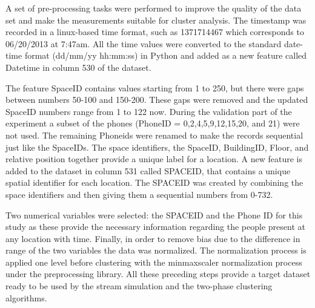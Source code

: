 


A set of pre-processing tasks were performed to improve the quality of the data set and make the measurements suitable for cluster analysis.
The timestamp was recorded in a linux-based time format, such as 1371714467 which corresponds to 06/20/2013 at 7:47am. All the time values were converted to the standard date-time format (dd/mm/yy hh:mm:ss) in Python and added as a new feature called Datetime in column 530 of the dataset.

The feature SpaceID contains values starting from 1 to 250, but there were gaps between numbers 50-100 and 150-200. These gaps were removed and the updated SpaceID numbers range from 1 to 122 now. During the validation part of the experiment a subset of the phones (PhoneID = 0,2,4,5,9,12,15,20, and 21) were not used. The remaining Phoneids were renamed to make the records sequential just like the SpaceIDs. The space identifiers, the SpaceID, BuildingID, Floor, and relative position together provide a unique label for a location. A new feature is added to the dataset in column 531 called SPACEID, that contains a unique spatial identifier for each location. The SPACEID was created by combining the space identifiers and then giving them a sequential numbers from 0-732.

Two numerical variables were selected: the SPACEID and the Phone ID for this study as these provide the necessary information regarding the people present at any location with time. Finally, in order to remove bias due to the difference in range of the two variables the data was normalized. The normalization process is applied one level before clustering with the minmaxscaler normalization process under the preprocessing library. All these preceding steps provide a target dataset ready to be used by the stream simulation and the two-phase clustering algorithms. 




